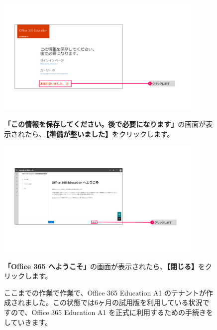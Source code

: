 \begin{figure}[h]
    \begin{minipage}{0.6\textwidth}
        \includegraphics[width=10cm]{figures/O365A1_submission06.png}
    \end{minipage}
    \begin{minipage}{0.4\textwidth}
       \textbf{「この情報を保存してください。後で必要になります」}の画面が表示されたら、\textbf{【準備が整いました】}をクリックします。
    \end{minipage}
\end{figure}

\begin{figure}[h]
    \begin{minipage}{0.6\textwidth}
        \includegraphics[width=10cm]{figures/O365A1_submission07.png}
    \end{minipage}
    \begin{minipage}{0.4\textwidth}
       \textbf{「Office 365 へようこそ」}の画面が表示されたら、\textbf{【閉じる】}をクリックします。
    \end{minipage}
\end{figure}

\begin{figure}[h]
    \begin{minipage}{1.0\textwidth}
        ここまでの作業で作業で、Office 365 Education A1 のテナントが作成されました。この状態では6ヶ月の試用版を利用している状況ですので、Office 365 Education A1 を正式に利用するための手続きをしていきます。
    \end{minipage}
    \vspace{3cm}
\end{figure}



